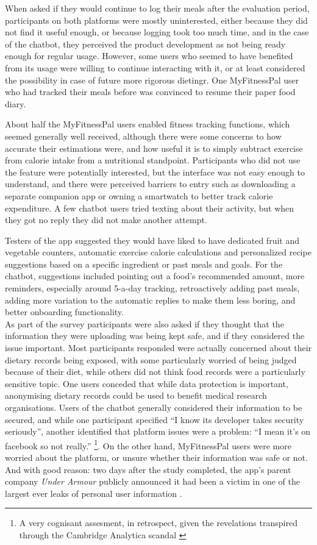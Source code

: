 When asked if they would continue to log their meals after the evaluation period, participants on both platforms were mostly uninterested, either because they did not find it useful enough, or because logging took too much time, and in the case of the chatbot, they perceived the product development as not being ready enough for regular usage. However, some users who seemed to have benefited from its usage were willing to continue interacting with it, or at least considered the possibility in case of future more rigorous dietingr. One MyFitnessPal user who had tracked their meals before was convinced to resume their paper food diary. 

About half the MyFitnessPal users enabled fitness tracking functions, which seemed generally well received, although there were some concerns to how accurate their estimations were, and how useful it is to simply subtract exercise from calorie intake from a nutritional standpoint. Participants who did not use the feature were potentially interested, but the interface was not easy enough to understand, and there were perceived barriers to entry such as downloading a separate companion app or owning a smartwatch to better track calorie expenditure. A few chatbot users tried texting about their activity, but when they got no reply they did not make another attempt.

Testers of the app suggested they would have liked to have dedicated fruit and vegetable counters, automatic exercise calorie calculations and personalized recipe suggestions based on a specific ingredient or past meals and goals. For the chatbot, suggestions included pointing out a food's recommended amount, more reminders, especially around 5-a-day tracking, retroactively adding past meals, adding more variation to the automatic replies to make them less boring, and better onboarding functionality. \\
As part of the survey participants were  also asked if they thought that the information they were uploading was being kept safe, and if they considered the issue important. Most participants responded were actually concerned about their dietary records being exposed, with some particularly worried of being judged because of their diet, while others did not think food records were a particularly sensitive topic. One users conceded that while data protection is important, anonymising dietary records could be used to benefit medical research organisations. Users of the chatbot generally considered their information to be secured, and while one participant specified ``I know its developer takes security seriously'', another identified that platform issues were a problem: ``I mean it's on facebook so not really.'' \footnote{A very cognisant assesment, in retrospect, given the revelations transpired through the Cambridge Analytica scandal \cite{cambridgeanalytica}}. On the other hand, MyFitnessPal users were more worried about the platform, or unsure whether their information was safe or not. And with good reason: two days after the study completed, the app's parent company \textit{Under Armour} publicly announced it had been a victim in one of the largest ever leaks of personal user information \cite{underarmour}.
